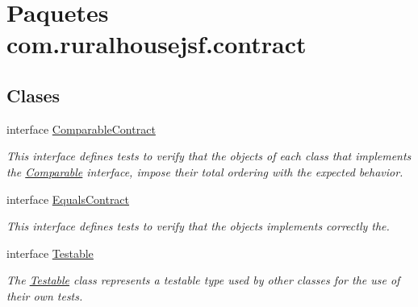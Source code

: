 \hypertarget{namespacecom_1_1ruralhousejsf_1_1contract}{}\section{Paquetes com.\+ruralhousejsf.\+contract}
\label{namespacecom_1_1ruralhousejsf_1_1contract}
\subsection*{Clases}
\begin{DoxyCompactItemize}
\item 
interface \mbox{\hyperlink{interfacecom_1_1ruralhousejsf_1_1contract_1_1_comparable_contract}{Comparable\+Contract}}
\begin{DoxyCompactList}\small\item\em This interface defines tests to verify that the objects of each class that implements the \mbox{\hyperlink{}{Comparable}} interface, impose their total ordering with the expected behavior. \end{DoxyCompactList}\item 
interface \mbox{\hyperlink{interfacecom_1_1ruralhousejsf_1_1contract_1_1_equals_contract}{Equals\+Contract}}
\begin{DoxyCompactList}\small\item\em This interface defines tests to verify that the objects implements correctly the. \end{DoxyCompactList}\item 
interface \mbox{\hyperlink{interfacecom_1_1ruralhousejsf_1_1contract_1_1_testable}{Testable}}
\begin{DoxyCompactList}\small\item\em The \mbox{\hyperlink{interfacecom_1_1ruralhousejsf_1_1contract_1_1_testable}{Testable}} class represents a testable type used by other classes for the use of their own tests. \end{DoxyCompactList}\end{DoxyCompactItemize}
